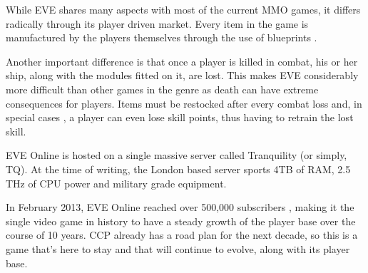 While EVE shares many aspects with most of the current MMO games, it differs radically through its player driven market. Every item in the game is manufactured by the players themselves through the use of blueprints \cite{bpo}.

Another important difference is that once a player is killed in combat, his or her ship, along with the modules fitted on it, are lost. This makes EVE considerably more difficult than other games in the genre as death can have extreme consequences for players. Items must be restocked after every combat loss and, in special cases \cite{poddeath}, a player can even lose skill points, thus having to retrain the lost skill.

EVE Online is hosted on a single massive server called Tranquility (or simply, TQ). At the time of writing, the London based server sports 4TB of RAM, 2.5 THz of CPU power and military grade equipment.

In February 2013, EVE Online reached over 500,000 subscribers \cite{500k}, making it the single video game in history to have a steady growth of the player base over the course of 10 years. CCP already has a road plan for the next decade, so this is a game that’s here to stay and that will continue to evolve, along with its player base.
